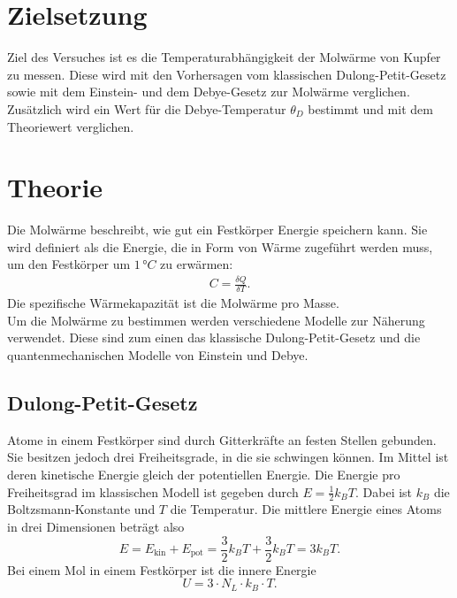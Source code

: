 \section{Zielsetzung}
\label{sec:Zielsetzung}

Ziel des Versuches ist es die Temperaturabhängigkeit der Molwärme von Kupfer zu messen. Diese wird mit den Vorhersagen 
vom klassischen Dulong-Petit-Gesetz sowie mit dem Einstein- und dem Debye-Gesetz zur Molwärme verglichen. Zusätzlich wird ein Wert für die Debye-Temperatur $\theta_D$ bestimmt und mit dem Theoriewert verglichen.


\section{Theorie}
\label{sec:Theorie}
Die Molwärme beschreibt, wie gut ein Festkörper Energie speichern kann. Sie wird definiert als die Energie, die in Form von Wärme zugeführt werden muss, 
um den Festkörper um $1\,\si{°C}$ zu erwärmen: 
\begin{align*}
    C = \frac{\delta Q}{\delta T}.
\end{align*}
Die spezifische Wärmekapazität ist die Molwärme pro Masse.\\
Um die Molwärme zu bestimmen werden verschiedene Modelle zur Näherung verwendet. Diese sind zum einen das klassische Dulong-Petit-Gesetz und die quantenmechanischen 
Modelle von Einstein und Debye. 
\subsection{Dulong-Petit-Gesetz}
\label{sec:dulongpetit}

Atome in einem Festkörper sind durch Gitterkräfte an festen Stellen gebunden. Sie besitzen jedoch drei Freiheitsgrade, in die sie schwingen können. 
Im Mittel ist deren kinetische Energie gleich der potentiellen Energie. Die Energie pro Freiheitsgrad im klassischen Modell ist gegeben durch 
$E = \frac{1}{2}k_B T$. Dabei ist $k_B$ die Boltzsmann-Konstante und $T$ die Temperatur. Die mittlere Energie eines Atoms in drei Dimensionen beträgt also 
\begin{equation}
    E = E_{\text{kin}} + E_{\text{pot}} = \frac{3}{2}k_B T + \frac{3}{2}k_B T = 3k_B T.
\end{equation}
Bei einem Mol in einem Festkörper ist die innere Energie 
\begin{equation}
    U = 3 \cdot N_L\cdot k_B \cdot T.
\end{equation}

